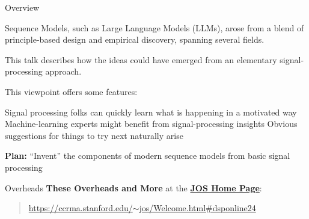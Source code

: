\begin{slide}[\slideopts]{Overview}

\begin{itemize}

\mpitem Sequence Models, such as Large Language Models (LLMs), arose
from a blend of principle-based design and empirical discovery,
spanning several fields.

\mpitem This talk describes how the ideas could have emerged from an
elementary signal-processing approach.

\mpitem This viewpoint offers some features:
\begin{enumerate}
\mpitem Signal processing folks can quickly learn what is happening in a motivated way
\mpitem Machine-learning experts might benefit from signal-processing insights
\mpitem Obvious suggestions for things to try next naturally arise
\end{enumerate}
\end{itemize}


\vspace{1em}
\maybepause
\textbf{Plan:}
``Invent'' the components of modern sequence models from basic signal processing
\end{slide}

\begin{slide}[\slideopts,method=direct,toc={}]{Overheads}
\textbf{These Overheads and More} at the \href{https://ccrma.stanford.edu/~jos/Welcome.html#dsponline24}{\textbf{JOS Home Page}}:
\begin{quote}
\href{https://ccrma.stanford.edu/~jos/Welcome.html#dsponline24}{https://ccrma.stanford.edu/$\sim$jos/Welcome.html\#dsponline24}
\end{quote}
\end{slide}

